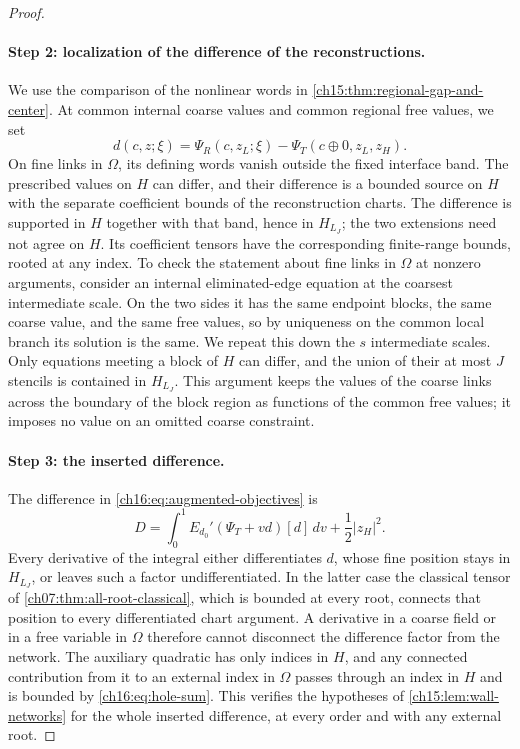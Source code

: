 \begin{proof}
\paragraph{Step 2: localization of the difference of the reconstructions.}
We use the comparison of the nonlinear words in \cref{ch15:thm:regional-gap-and-center}. At common internal coarse values and common regional free values, we set
\[
 d(c,z;\xi)=\Psi_R(c,z_L;\xi)-\Psi_T(c\oplus0,z_L,z_H).
\]
On fine links in $\Omega$, its defining words vanish outside the fixed interface band. The prescribed values on $H$ can differ, and their difference is a bounded source on $H$ with the separate coefficient bounds of the reconstruction charts. The difference is supported in $H$ together with that band, hence in $H_{L_J}$; the two extensions need not agree on $H$. Its coefficient tensors have the corresponding finite-range bounds, rooted at any index. To check the statement about fine links in $\Omega$ at nonzero arguments, consider an internal eliminated-edge equation at the coarsest intermediate scale. On the two sides it has the same endpoint blocks, the same coarse value, and the same free values, so by uniqueness on the common local branch its solution is the same. We repeat this down the $s$ intermediate scales. Only equations meeting a block of $H$ can differ, and the union of their at most $J$ stencils is contained in $H_{L_J}$. This argument keeps the values of the coarse links across the boundary of the block region as functions of the common free values; it imposes no value on an omitted coarse constraint.

\paragraph{Step 3: the inserted difference.}
The difference in \eqref{ch16:eq:augmented-objectives} is
\begin{equation}\label{ch16:eq:action-insertion}
 D=\int_0^1 E_{d_0}'(\Psi_T+v d)[d]\,dv
                                          +\frac12|z_H|^2.
\end{equation}
Every derivative of the integral either differentiates $d$, whose fine position stays in $H_{L_J}$, or leaves such a factor undifferentiated. In the latter case the classical tensor of \cref{ch07:thm:all-root-classical}, which is bounded at every root, connects that position to every differentiated chart argument. A derivative in a coarse field or in a free variable in $\Omega$ therefore cannot disconnect the difference factor from the network. The auxiliary quadratic has only indices in $H$, and any connected contribution from it to an external index in $\Omega$ passes through an index in $H$ and is bounded by \eqref{ch16:eq:hole-sum}. This verifies the hypotheses of \cref{ch15:lem:wall-networks} for the whole inserted difference, at every order and with any external root.


\end{proof}
